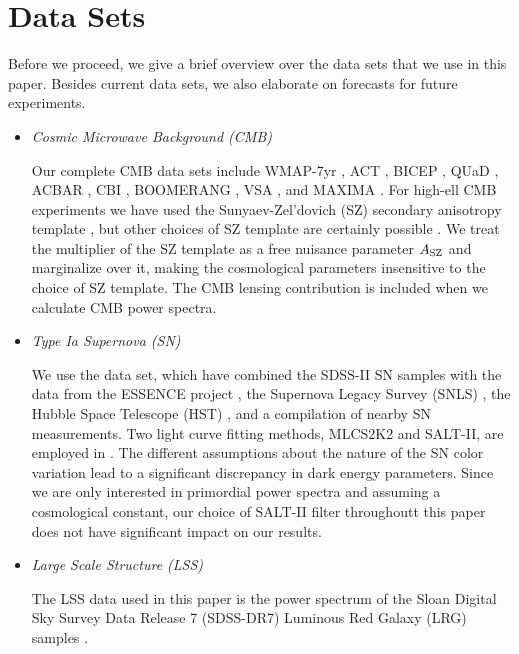 \documentclass[a4paper,11pt]{article}
\begin{document}
\section{Data Sets}\label{sec:data_sets}
Before we proceed, we give a brief overview over the data sets that we
use in this paper. Besides current data sets, we also elaborate on
forecasts for future experiments.
\begin{itemize}
\item {\it Cosmic Microwave Background (CMB)} 

Our complete CMB data sets include WMAP-7yr
\cite{Komatsu2010,Jarosik2010}, ACT \cite{Fowler2010}, BICEP
\cite{Chiang2009}, QUaD \cite{Castro2009}, ACBAR
\cite{Reichardt2008,Kuo2006,Runyan2003, Goldstein2003}, CBI
\cite{Sievers2007,Readhead2004a,Readhead2004b,Pearson2003}, BOOMERANG
\cite{Jones2006,Piacentini2006,Montroy2006}, VSA \cite{Dickinson2004},
and MAXIMA \cite{Hanany2000}. For high-ell CMB experiments we have
used the Sunyaev-Zel'dovich (SZ) secondary anisotropy
\cite{Sunyaev1972,Sunyaev1980} template \cite{Bond2005}, but other
choices of SZ template are certainly possible \cite{Komatsu2002,
  Sehgal2009, Battaglia2010}. We treat the multiplier of the SZ
template as a free nuisance parameter $A_{\rm SZ}$ and marginalize
over it, making the cosmological parameters insensitive to the choice
of SZ template. The CMB lensing contribution is included when we
calculate CMB power spectra.

\item{\it Type Ia Supernova (SN)}

We use the \cite{Kessler2009} data set, which have combined the
SDSS-II SN samples with the data from the ESSENCE project
\cite{Miknaitis2007, Wood-Vasey2007}, the Supernova Legacy Survey
(SNLS) \cite{Astier2006}, the Hubble Space Telescope (HST)
\cite{Garnavich1998, Knop2003,Riess2004,Riess2007}, and a compilation
of nearby SN measurements. Two light curve fitting methods, MLCS2K2
and SALT-II, are employed in \cite{Kessler2009}. The different
assumptions about the nature of the SN color variation lead to a
significant discrepancy in dark energy parameters. Since we are only
interested in primordial power spectra and assuming a cosmological
constant, our choice of SALT-II filter throughoutt this paper does not
have significant impact on our results.

\item{\it Large Scale Structure (LSS)}

The LSS data used in this paper is the power spectrum of the Sloan
Digital Sky Survey Data Release 7 (SDSS-DR7) Luminous Red Galaxy (LRG)
samples \cite{Reid2009}. 


\end{itemize}
\end{document}
